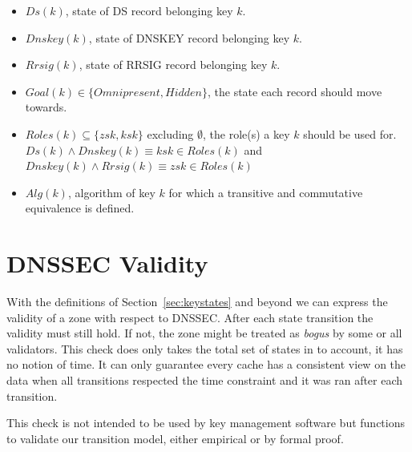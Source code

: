 \documentclass[twoside,english, a4paper]{article}
\begin{document}
\begin{itemize}
	\item $Ds(k)$, state of DS record belonging key $k$.
	\item $Dnskey(k)$, state of DNSKEY record belonging key $k$.
	\item $Rrsig(k)$, state of RRSIG record belonging key $k$.
	\item $Goal(k) \in \{Omnipresent, Hidden\}$, the state each record
		should move towards.
	\item $Roles(k) \subseteq \{zsk,ksk\}$ excluding $\emptyset$, the 
		role(s) a key $k$ should be used for.
		$Ds(k) \wedge Dnskey(k) \equiv ksk \in Roles(k)$ and
		$Dnskey(k) \wedge Rrsig(k) \equiv zsk \in Roles(k)$
	\item $Alg(k)$, algorithm of key $k$ for which a transitive and 
		commutative equivalence is defined.
\end{itemize}

\section{DNSSEC Validity} \label{validity}

With the definitions of Section~\ref{sec:keystates} and beyond we can
express the validity of a zone with respect to DNSSEC. After each state
transition the validity must still hold. If not, the zone might be treated as
\emph{bogus} by some or all validators. This check does only takes the 
total set of states in to account, it has no notion of time. It can
only guarantee every cache has a consistent view on the data when all
transitions respected the time constraint and it was ran after each
transition.

This check is not intended to be used by key management software but
functions to validate our transition model, either empirical or by 
formal proof.
\end{document}
